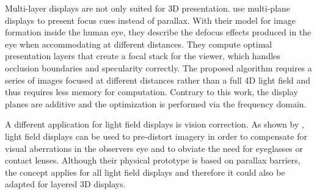 Multi-layer displays are not only suited for 3D presentation.
\cite{FocusCuesMultiPlaneDisplays} use multi-plane displays to present focus cues instead of parallax.
With their model for image formation inside the human eye, they describe the defocus effects produced in the eye when accommodating at different distances.
They compute optimal presentation layers that create a focal stack for the viewer, which handles occlusion boundaries and specularity correctly.
The proposed algorithm requires a series of images focused at different distances rather than a full 4D light field and thus requires less memory for computation.
Contrary to this work, the display planes are additive and the optimization is performed via the frequency domain.

A different application for light field displays is vision correction.
As shown by \cite{EyeglassesFreeDisplay}, light field displays can be used to pre-distort imagery in order to compensate for visual aberrations in the observers eye and to obviate the need for eyeglasses or contact lenses.
Although their physical prototype is based on parallax barriers, the concept applies for all light field displays and therefore it could also be adapted for layered 3D displays.
